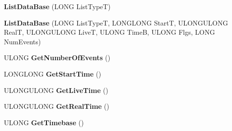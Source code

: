\begin{DoxyCompactItemize}
\item 
\mbox{\label{class_canberra_1_1_data_types_1_1_spectroscopy_1_1_list_data_base_a0b97fc39c42d3a75254666ea8a30b4a1}} 
{\bfseries List\+Data\+Base} (L\+O\+NG List\+TypeT)
\item 
\mbox{\label{class_canberra_1_1_data_types_1_1_spectroscopy_1_1_list_data_base_ae10a11bb8634cdff7e4e481380dd40ee}} 
{\bfseries List\+Data\+Base} (L\+O\+NG List\+TypeT, L\+O\+N\+G\+L\+O\+NG StartT, U\+L\+O\+N\+G\+U\+L\+O\+NG RealT, U\+L\+O\+N\+G\+U\+L\+O\+NG LiveT, U\+L\+O\+NG TimeB, U\+L\+O\+NG Flgs, L\+O\+NG Num\+Events)
\item 
\mbox{\label{class_canberra_1_1_data_types_1_1_spectroscopy_1_1_list_data_base_a069ae39f7d727361820914d004d4a0a2}} 
U\+L\+O\+NG {\bfseries Get\+Number\+Of\+Events} ()
\item 
\mbox{\label{class_canberra_1_1_data_types_1_1_spectroscopy_1_1_list_data_base_ad325e0a6b4fc231a584afff1d517c045}} 
L\+O\+N\+G\+L\+O\+NG {\bfseries Get\+Start\+Time} ()
\item 
\mbox{\label{class_canberra_1_1_data_types_1_1_spectroscopy_1_1_list_data_base_a890b80acbe9c54836860342b7f2c075c}} 
U\+L\+O\+N\+G\+U\+L\+O\+NG {\bfseries Get\+Live\+Time} ()
\item 
\mbox{\label{class_canberra_1_1_data_types_1_1_spectroscopy_1_1_list_data_base_ae84fa971f0c787b27dadfa28d27be04d}} 
U\+L\+O\+N\+G\+U\+L\+O\+NG {\bfseries Get\+Real\+Time} ()
\item 
\mbox{\label{class_canberra_1_1_data_types_1_1_spectroscopy_1_1_list_data_base_ab402a8a20d8cef793b5b30e9b9cd0b81}} 
U\+L\+O\+NG {\bfseries Get\+Timebase} ()
\item 
\mbox{\label{class_canberra_1_1_data_types_1_1_spectroscopy_1_1_list_data_base_ac172cefc78c8b1e96f8ae0b9cdd4f77d}} 

\end{DoxyCompactItemize}
